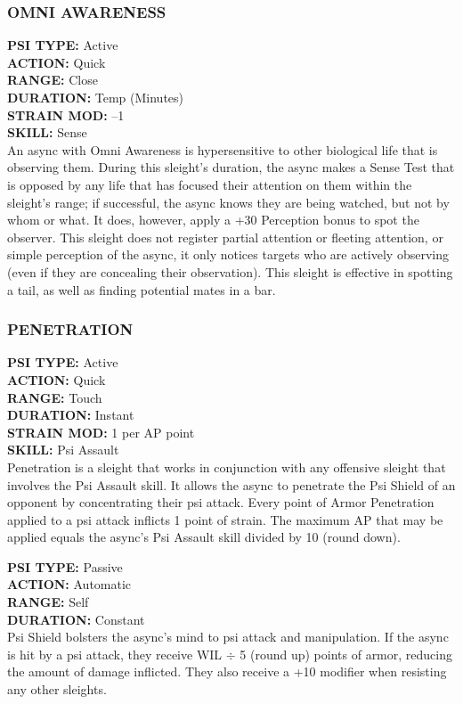 \subsubsection{OMNI AWARENESS} \textbf{PSI TYPE:} Active \\ \textbf{ACTION:} Quick \\ \textbf{RANGE:} Close \\ \textbf{DURATION:} Temp (Minutes) \\ \textbf{STRAIN MOD:} –1 \\ \textbf{SKILL:} Sense\\ An async with Omni Awareness is hypersensitive to other biological life that is observing them. During this sleight’s duration, the async makes a Sense Test that is opposed by any life that has focused their attention on them within the sleight’s range; if successful, the async knows they are being watched, but not by whom or what. It does, however, apply a +30 Perception bonus to spot the observer. This sleight does not register partial attention or fleeting attention, or simple perception of the async, it only notices targets who are actively observing (even if they are concealing their observation). This sleight is effective in spotting a tail, as well as finding potential mates in a bar. 

\subsubsection{PENETRATION} \textbf{PSI TYPE:} Active \\ \textbf{ACTION:} Quick \\ \textbf{RANGE:} Touch \\ \textbf{DURATION:} Instant \\ \textbf{STRAIN MOD:} 1 per AP point \\ \textbf{SKILL:} Psi Assault \\ Penetration is a sleight that works in conjunction with any offensive sleight that involves the Psi Assault skill. It allows the async to penetrate the Psi Shield of an opponent by concentrating their psi attack. Every point of Armor Penetration applied to a psi attack inflicts 1 point of strain. The maximum AP that may be applied equals the async’s Psi Assault skill divided by 10 (round down). 

 \textbf{PSI TYPE:} Passive \\ \textbf{ACTION:} Automatic \\ \textbf{RANGE:} Self \\ \textbf{DURATION:} Constant \\ Psi Shield bolsters the async’s mind to psi attack and manipulation. If the async is hit by a psi attack, they receive WIL $\div$ 5 (round up) points of armor, reducing the amount of damage inflicted. They also receive a +10 modifier when resisting any other sleights. 

